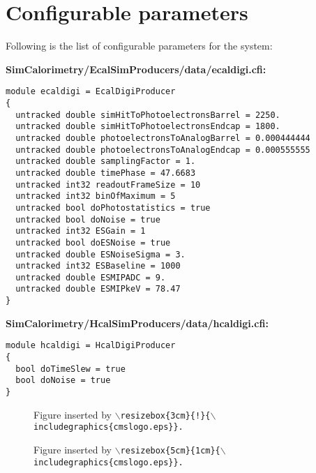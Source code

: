 \documentclass{cmspaper}
\begin{document}
\section{Configurable parameters}

Following is the list of configurable parameters for the system:

\bf{SimCalorimetry/EcalSimProducers/data/ecaldigi.cfi:}

\begin{verbatim}
module ecaldigi = EcalDigiProducer
{
  untracked double simHitToPhotoelectronsBarrel = 2250.
  untracked double simHitToPhotoelectronsEndcap = 1800.
  untracked double photoelectronsToAnalogBarrel = 0.000444444
  untracked double photoelectronsToAnalogEndcap = 0.000555555
  untracked double samplingFactor = 1.
  untracked double timePhase = 47.6683
  untracked int32 readoutFrameSize = 10
  untracked int32 binOfMaximum = 5
  untracked bool doPhotostatistics = true
  untracked bool doNoise = true
  untracked int32 ESGain = 1
  untracked bool doESNoise = true
  untracked double ESNoiseSigma = 3.
  untracked int32 ESBaseline = 1000
  untracked double ESMIPADC = 9.
  untracked double ESMIPkeV = 78.47
}

\end{verbatim}

\bf{SimCalorimetry/HcalSimProducers/data/hcaldigi.cfi:}

\begin{verbatim}
module hcaldigi = HcalDigiProducer
{
  bool doTimeSlew = true
  bool doNoise = true
}
\end{verbatim}

\begin{figure}[hbtp]
  \begin{center}
    \caption{Figure inserted by 
      \tt $\backslash$resizebox\{3cm\}\{!\}\{$\backslash$includegraphics\{cmslogo.eps\}\}.}
    \label{fig:ex1}
  \end{center}
\end{figure}

\begin{figure}[hbtp]
  \begin{center}
    \caption{Figure inserted by 
       \tt $\backslash$resizebox\{5cm\}\{1cm\}\{$\backslash$includegraphics\{cmslogo.eps\}\}.}
    \label{fig:ex2}
  \end{center}
\end{figure}
\end{document}
